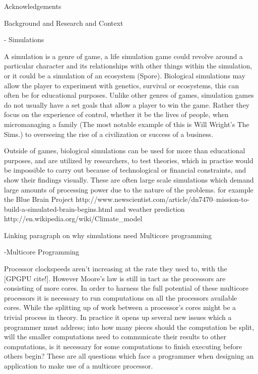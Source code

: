 \documentclass[main.tex]{subfiles}
\begin{document}



Acknowledgements

Background and Research and Context



- Simulations

A simulation is a genre of game, a life simulation game could revolve around a particular character and its relationships with other things within the simulation, or it could be a simulation of an ecosystem (Spore). Biological simulations may allow the player to experiment with genetics, survival or ecosystems, this can often be for educational purposes. Unlike other genres of games, simulation games do not usually have a set goals that allow a player to win the game. Rather they focus on the experience of control, whether it be the lives of people, when micromanaging a family (The most notable example of this is Will Wright's The Sims.) to overseeing the rise of a civilization or success of a business. 



Outside of games, biological simulations can be used for more than educational purposes, and are utilized by researchers, to test theories, which in practise would be impossible to carry out because of technological or financial constraints, and show their findings visually. These are often large scale simulations which demand large amounts of processing power due to the nature of the problems. for example the Blue Brain Project http://www.newscientist.com/article/dn7470--mission-to-build-a-simulated-brain-begins.html and weather prediction http://en.wikipedia.org/wiki/Climate_model



Linking paragraph on why simulations need Multicore programming



-Multicore Programming

Processor clockspeeds aren't increasing at the rate they used to, with the [GPGPU cite!]. However Moore's law is still in tact as the processors are consisting of more cores. In order to harness the full potential of these multicore processors it is necessary to run computations on all the processors available cores. While the splitting up of work between a processor's cores might be a trivial process in theory. In practice it opens up several new issues which a programmer must address; into how many pieces should the computation be split, will the smaller computations need to communicate their results to other computations, is it necessary for some computations to finish executing before others begin? These are all questions which face a programmer when designing an application to make use of a multicore processor. 
\end{document}
